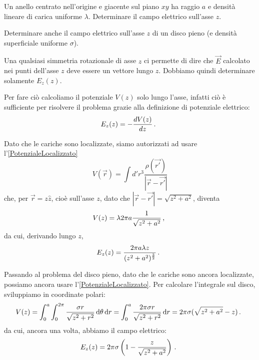 \documentclass[../main.tex]{subfiles}
\begin{document}

\textex
Un anello centrato nell'origine e giacente sul piano $xy$ ha raggio $a$ e densità lineare di carica uniforme $\lambda$. Determinare il campo elettrico sull'asse $z$.

Determinare anche il campo elettrico sull'asse $z$ di un disco pieno (e densità superficiale uniforme $\sigma$).

\solution

Una qualsiasi simmetria rotazionale di asse $z$ ci permette di dire che $\vec{E}$ calcolato nei punti dell'asse $z$ deve essere un vettore lungo $z$.
Dobbiamo quindi determinare solamente $E_z(z)$.

Per fare ciò calcoliamo il potenziale $V(z)$ solo lungo l'asse, infatti ciò è sufficiente per risolvere il problema grazie alla definizione di potenziale elettrico:
\[
	E_z(z)=-\frac{dV(z)}{dz}\, \text{. }
\]

Dato che le cariche sono localizzate, siamo autorizzati ad usare l'\cref{PotenzialeLocalizzato}
\[
	V(\vec{r})=\int d'r^3 \frac{\rho(\vec{r'})}{|\vec{r}-\vec{r'}|}
\]
che, per $\vec{r}=z\hat{z}$, cioè sull'asse $z$, dato che $|\vec{r}-\vec{r'}|=\sqrt{z^2+a^2}$, diventa
\[
	V(z)=\lambda 2\pi a \frac{1}{\sqrt{z^2+a^2}}\, \text{, }
\]
da cui, derivando lungo $z$,
\[
	E_z(z)=\frac{2\pi a\lambda z}{(z^2+a^2)^{\frac{3}{2}}}\, \text{. }
\]

Passando al problema del disco pieno, dato che le cariche sono ancora localizzate, possiamo ancora usare l'\cref{PotenzialeLocalizzato}. Per calcolare l'integrale sul disco, sviluppiamo in coordinate polari:
\[
	V(z)=\int_0^a \int_0^{2\pi} \frac{\sigma r}{\sqrt{z^2+r^2}}\,\mathrm d \theta \,\mathrm d r = \int_0^a \frac{2\pi\sigma r}{\sqrt{z^2+r^2}}\,\mathrm d r = 2\pi\sigma (\sqrt{z^2+a^2}-z)\, \text{. }
\]
da cui, ancora una volta, abbiamo il campo elettrico:
\[
	E_z(z)=2\pi\sigma \left(1-\frac{z}{\sqrt{z^2+a^2}}\right)\, \text{. }
\]
\end{document}
